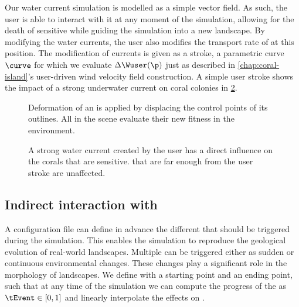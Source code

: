 Our water current simulation is modelled as a simple vector field. As such, the user is able to interact with it at any moment of the simulation, allowing for the death of sensitive  while guiding the simulation into a new landscape. By modifying the water currents, the user also modifies the transport rate of  at this position. The modification of currents is given as a stroke, a parametric curve $\curve$ for which we evaluate $\Delta \Wuser(\p)$ just as described in \cref{chap:coral-island}'s user-driven wind velocity field construction. A simple user stroke shows the impact of a strong underwater current on coral colonies in \cref{fig:env-obj-user-flow-effects}.

\begin{figure}
    \caption{Deformation of an  is applied by displacing the control points of its outlines. All  in the scene evaluate their new fitness in the environment.}
    \label{fig:env-obj-island-deformation}
\end{figure}

\begin{figure}
    \caption{A strong water current created by the user has a direct influence on the corals that are sensitive.  that are far enough from the user stroke are unaffected.}
    \label{fig:env-obj-user-flow-effects}
\end{figure}

\subsection{Indirect interaction with }
\label{sec:env-obj-events}
A configuration file can define in advance the different  that should be triggered during the simulation. 
This enables the simulation to reproduce the geological evolution of real-world landscapes.
Multiple  can be triggered either as sudden or continuous environmental changes. These changes play a significant role in the morphology of landscapes.
We define  with a starting point and an ending point, such that at any time of the simulation we can compute the progress of the  as $\tEvent \in [0, 1]$ and linearly interpolate the effects on .

